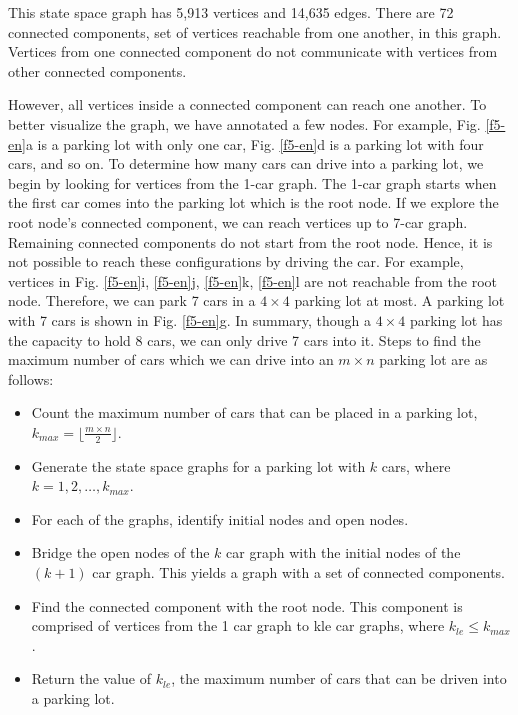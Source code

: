 
This state space graph has 5,913 vertices and 14,635 edges. There are 72 connected components, set of vertices reachable from one another, in this graph. Vertices from one connected component do not communicate with vertices from other connected components.

However, all vertices inside a connected component can reach one another. To better visualize the graph, we have annotated a few nodes. For example, Fig. \ref{f5-en}a is a parking lot with only one car, Fig. \ref{f5-en}d is a parking lot with four cars, and so on. To determine how many cars can drive into a parking lot, we begin by looking for vertices from the 1-car graph. The 1-car graph starts when the first car comes into the parking lot which is the root node. If we explore the root node’s connected component, we can reach vertices up to 7-car graph. Remaining connected components do not start from the root node. Hence, it is not possible to reach these configurations by driving the car. For example, vertices in Fig. \ref{f5-en}i, \ref{f5-en}j, \ref{f5-en}k, \ref{f5-en}l are not reachable from the root node. Therefore, we can park 7 cars in a $4 \times 4$ parking lot at most. A parking lot with 7 cars is shown in Fig. \ref{f5-en}g. In summary, though a $4 \times 4$ parking lot has the capacity to hold 8 cars, we can only drive 7 cars into it. Steps to find the maximum number of cars which we can drive into an $m \times n$ parking lot are as follows:

\begin{itemize}
    \item Count the maximum number of cars that can be placed in a parking lot, $k_{max} = \lfloor\frac{m\times n}{2}\rfloor$.
    \item Generate the state space graphs for a parking lot with $k$ cars, where $k = 1, 2, \dots, k_{max}$.
    \item For each of the graphs, identify initial nodes and open nodes.
    \item Bridge the open nodes of the $k$ car graph with the initial nodes of the $(k +1)$ car graph. This yields a graph with a set of connected components.
    \item Find the connected component with the root node. This component is comprised of vertices from the 1 car graph to kle car graphs, where $k_{le}\le k_{max}$.
    \item Return the value of $k_{le}$, the maximum number of cars that can be driven into a parking lot.
\end{itemize}

